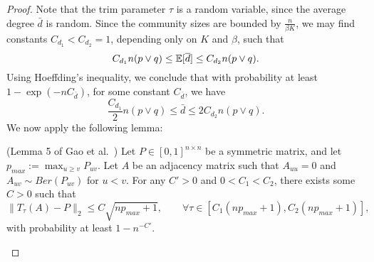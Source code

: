 \documentclass{article}
\begin{document}
\begin{proof}
Note that the trim parameter $\tau$ is a random variable, since the average degree $\bar d$ is random. Since the community sizes are bounded by $\frac{n}{\beta K}$, we may find constants $C_{d_1} < C_{d_2}= 1$, depending only on $K$ and $\beta$, such that 
$$C_{d_1}n (p \vee q) \leq  {\mathbb E}[\overline{d}] \leq C_{d_2} n(p \vee q).$$ 
Using Hoeffding's inequality, we conclude that with probability at least $1 - \exp(-nC_{\bar d})$, for some constant $C_{\bar d}$, we have
\begin{equation}
\label{EqnEmerson}
\frac{C_{d_1}}{2} n (p \vee q) \leq  \bar d \leq 2C_{d_2} n(p \vee q).
\end{equation}
We now apply the following lemma:

\begin{lemma} (Lemma 5 of Gao et al.~\cite{GaoEtal15})
\label{lem:trimmed_A_bound}
Let $P \in [0,1]^{n \times n}$ be a symmetric matrix, and let $p_{max} := \max_{u \geq v} P_{uv}$. Let $A$ be an adjacency matrix such that $A_{uu} = 0$ and $A_{uv} \sim Ber(P_{uv})$ for $u < v$. For any $C' > 0$ and $0 < C_1 < C_2$, there exists some $C > 0$ such that
\[
\| T_\tau(A) - P \|_2 \leq C \sqrt{ n p_{max} + 1}, \qquad \forall \tau \in [C_1 (np_{max} + 1), C_2 (np_{max} + 1)],
\]
with probability at least $1-n^{-C'}$.
\end{lemma}



\end{proof}
\end{document}
